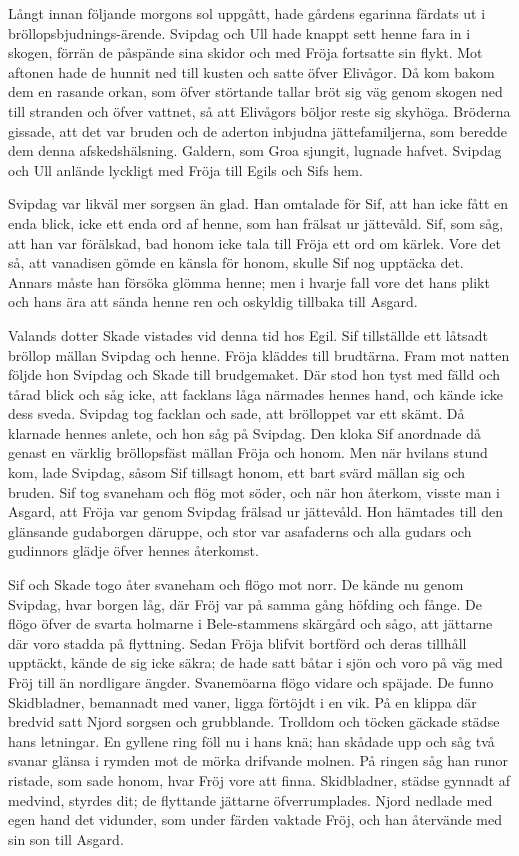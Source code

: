 Långt innan följande morgons sol uppgått, hade gårdens egarinna färdats
ut i bröllopsbjudnings-ärende. Svipdag och Ull hade knappt sett henne
fara in i skogen, förrän de påspände sina skidor och med Fröja fortsatte
sin flykt. Mot aftonen hade de hunnit ned till kusten och satte öfver
Elivågor. Då kom bakom dem en rasande orkan, som öfver störtande tallar
bröt sig väg genom skogen ned till stranden och öfver vattnet, så att
Elivågors böljor reste sig skyhöga. Bröderna gissade, att det var bruden
och de aderton inbjudna jättefamiljerna, som beredde dem denna
afskedshälsning. Galdern, som Groa sjungit, lugnade hafvet. Svipdag och
Ull anlände lyckligt med Fröja till Egils och Sifs hem.

Svipdag var likväl mer sorgsen än glad. Han omtalade för Sif, att han
icke fått en enda blick, icke ett enda ord af henne, som han frälsat ur
jättevåld. Sif, som såg, att han var förälskad, bad honom icke tala till
Fröja ett ord om kärlek. Vore det så, att vanadisen gömde en känsla för
honom, skulle Sif nog upptäcka det. Annars måste han försöka glömma
henne; men i hvarje fall vore det hans plikt och hans ära att sända
henne ren och oskyldig tillbaka till Asgard.

Valands dotter Skade vistades vid denna tid hos Egil. Sif tillställde
ett låtsadt bröllop mällan Svipdag och henne. Fröja kläddes till
brudtärna. Fram mot natten följde hon Svipdag och Skade till
brudgemaket. Där stod hon tyst med fälld och tårad blick och såg icke,
att facklans låga närmades hennes hand, och kände icke dess sveda.
Svipdag tog facklan och sade, att brölloppet var ett skämt. Då klarnade
hennes anlete, och hon såg på Svipdag. Den kloka Sif anordnade då genast
en värklig bröllopsfäst mällan Fröja och honom. Men när hvilans stund
kom, lade Svipdag, såsom Sif tillsagt honom, ett bart svärd mällan sig
och bruden. Sif tog svaneham och flög mot söder, och när hon återkom,
visste man i Asgard, att Fröja var genom Svipdag frälsad ur jättevåld.
Hon hämtades till den glänsande gudaborgen däruppe, och stor var
asafaderns och alla gudars och gudinnors glädje öfver hennes återkomst.



Sif och Skade togo åter svaneham och flögo mot norr. De kände nu genom
Svipdag, hvar borgen låg, där Fröj var på samma gång höfding och fånge.
De flögo öfver de svarta holmarne i Bele-stammens skärgård och sågo, att
jättarne där voro stadda på flyttning. Sedan Fröja blifvit bortförd och
deras tillhåll upptäckt, kände de sig icke säkra; de hade satt båtar i
sjön och voro på väg med Fröj till än nordligare ängder. Svanemöarna
flögo vidare och späjade. De funno Skidbladner, bemannadt med vaner,
ligga förtöjdt i en vik. På en klippa där bredvid satt Njord sorgsen och
grubblande. Trolldom och töcken gäckade städse hans letningar. En
gyllene ring föll nu i hans knä; han skådade upp och såg två svanar
glänsa i rymden mot de mörka drifvande molnen. På ringen såg han runor
ristade, som sade honom, hvar Fröj vore att finna. Skidbladner, städse
gynnadt af medvind, styrdes dit; de flyttande jättarne öfverrumplades.
Njord nedlade med egen hand det vidunder, som under färden vaktade Fröj,
och han återvände med sin son till Asgard.

